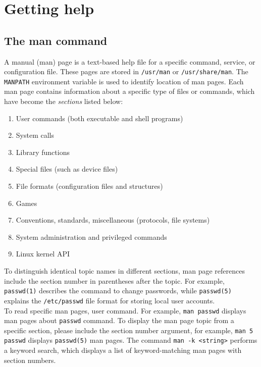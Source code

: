 \chapter{Getting help}

\section{The man command}

A manual (man) page is  a text-based help file for a specific command, service, or configuration file. These pages are stored in 	\verb|/usr/man| or \verb|/usr/share/man|. The \verb|MANPATH| environment variable is used to identify location of man pages. Each man page contains information about a specific type of files or commands, which have become the \emph{sections} listed below:

\begin{enumerate}
\item User commands (both executable and shell programs)
\item System calls
\item Library functions
\item Special files (such as device files)
\item File formats (configuration files and structures)
\item Games
\item Conventions, standards, miscellaneous (protocols, file systems)
\item System administration and privileged commands
\item Linux kernel API
\end{enumerate}

To distinguish identical topic names in different sections, man page references include the section number in parentheses after the topic. For example, \verb|passwd(1)| describes the command to change passwords, while \verb|passwd(5)| explains the \verb|/etc/passwd| file format for storing local user accounts.\\

To read specific man pages, user  command. For example, \verb|man passwd| displays man pages about \verb|passwd| command. To display the man page topic from a specific section, please include the section number argument, for example, \verb|man 5 passwd| displays \verb|passwd(5)| man pages. The command \verb|man -k <string>| performs a keyword search, which displays a list of keyword-matching man pages with section numbers.

